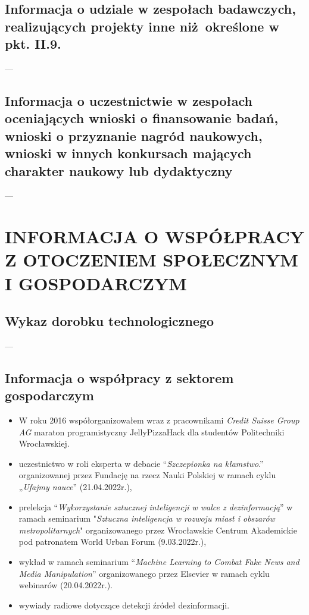 \begin{fullwidth}
	
\subsection{Informacja o udziale w zespołach badawczych, realizujących projekty inne niż określone w pkt. II.9.}

---

\subsection{Informacja o uczestnictwie w zespołach oceniających wnioski o finansowanie badań, wnioski o przyznanie nagród naukowych, wnioski w innych konkursach mających charakter naukowy lub dydaktyczny}

---


\section{INFORMACJA O WSPÓŁPRACY Z OTOCZENIEM SPOŁECZNYM I GOSPODARCZYM}

\subsection{Wykaz dorobku technologicznego}

---


\subsection{Informacja o współpracy z sektorem gospodarczym}


\begin{itemize}
	\item W roku 2016 współorganizowałem wraz z pracownikami \emph{Credit Suisse Group AG} maraton programistyczny JellyPizzaHack dla studentów Politechniki Wrocławskiej.
	\item uczestnictwo w roli eksperta w debacie “\emph{Szczepionka na kłamstwo}.” organizowanej przez Fundację na rzecz Nauki Polskiej w ramach cyklu „\emph{Ufajmy nauce}” (21.04.2022r.),
	\item prelekcja “\emph{Wykorzystanie sztucznej inteligencji w walce z dezinformacją}” w ramach seminarium "\emph{Sztuczna inteligencja w rozwoju miast i obszarów metropolitarnych}" organizowanego przez Wrocławskie Centrum Akademickie pod patronatem World Urban Forum (9.03.2022r.),
	\item wykład w ramach seminarium “\emph{Machine Learning to Combat Fake News and Media Manipulation}” organizowanego przez Elsevier w ramach cyklu webinarów (20.04.2022r.).
	\item wywiady radiowe dotyczące detekcji źródeł dezinformacji.
\end{itemize}


\end{fullwidth}
